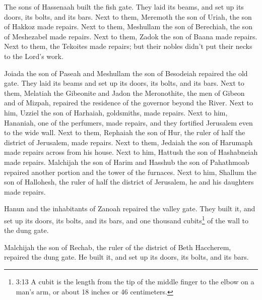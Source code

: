\myverse{}The sons of Hassenaah built the fish gate. They laid its beams,
and set up its doors, its bolts, and its bars.
\myverse{}Next to them, Meremoth the son of Uriah, the son of Hakkoz made repairs. Next
to them, Meshullam the son of Berechiah, the son of Meshezabel made repairs. Next to them, Zadok the son
of Baana made repairs.
\myverse{}Next to them, the Tekoites made repairs; but their nobles didn’t put their necks
to the Lord’s work.

\myverse{}Joiada the son of Paseah and Meshullam the son of Besodeiah repaired
the old gate. They laid its beams and set up its doors, its bolts, and its bars.
\myverse{}Next to them, Melatiah the Gibeonite and Jadon the Meronothite, the men of Gibeon
and of Mizpah, repaired the residence of the governor beyond the River.
\myverse{}Next to him, Uzziel the son of Harhaiah, goldsmiths, made repairs. Next to him,
Hananiah, one of the perfumers, made repairs, and they fortified Jerusalem even to the wide wall.
\myverse{}Next to them, Rephaiah the son of Hur, the ruler of half the district of Jerusalem,
made repairs.
\myverse{}Next to them, Jedaiah the son of Harumaph made repairs across from his house.
Next to him, Hattush the son of Hashabneiah made repairs.
\myverse{}Malchijah the son of Harim and Hasshub the son of Pahathmoab repaired another
portion and the tower of the furnaces.
\myverse{}Next to him, Shallum the son of Hallohesh, the ruler of half the district
of Jerusalem, he and his daughters made repairs.

\myverse{}Hanun and the inhabitants of Zanoah repaired the valley gate.
They built it, and set up its doors, its bolts, and its bars, and one thousand cubits\footnote{3:13 A cubit is the length from the tip of the middle finger to the elbow on a man’s arm, or about
	18 inches or 46 centimeters.} of the wall to the dung gate.

\myverse{}Malchijah the son of Rechab, the ruler of the district of Beth
Haccherem, repaired the dung gate. He built it, and set up its doors, its bolts, and its bars.

